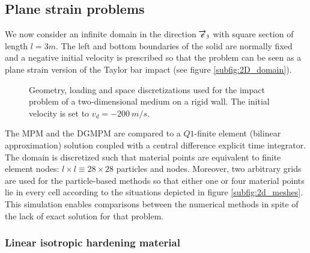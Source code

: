 \subsection{Plane strain problems}
\label{sec:plane-strain-problem}
We now consider an infinite domain in the direction ${\overrightarrow{e}}_3$ with square section of length $l=3m$.
The left and bottom boundaries of the solid are normally fixed and a negative initial velocity is prescribed so that the problem can be seen as a plane strain version of the Taylor bar impact (see figure \ref{subfig:2D_domain}).
\begin{figure}[h!]
  \centering
   \qquad
  \caption{Geometry, loading and space discretizations used for the impact problem of a two-dimensional medium on a rigid wall. The initial velocity is set to $v_d=-200 \: m/s$.}
  \label{fig:PS_domain}
\end{figure}

The MPM and the DGMPM are compared to a $Q1$-finite element (bilinear approximation) solution coupled with a central difference explicit time integrator.
The domain is discretized such that material points are equivalent to finite element nodes: $l\times l \equiv 28 \times 28$ particles and nodes.
Moreover, two arbitrary grids are used for the particle-based methods so that either one or four material points lie in every cell according to the situations depicted in figure \ref{subfig:2d_meshes}.
This simulation enables comparisons between the numerical methods in spite of the lack of exact solution for that problem.

\subsubsection{Linear isotropic hardening material}
\label{sec:line-isotr-hard}


